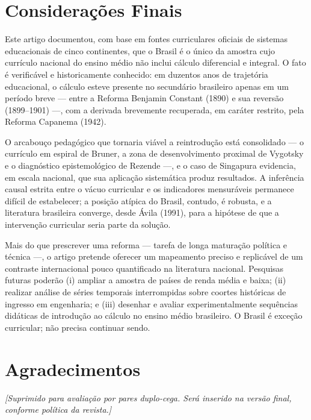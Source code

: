 \documentclass[12pt,a4paper,oneside]{article}
\begin{document}
\section{Considerações Finais}

Este artigo documentou, com base em fontes curriculares oficiais de
sistemas educacionais de cinco continentes, que o Brasil é o único da
amostra cujo currículo nacional do ensino médio não inclui cálculo
diferencial e integral. O fato é verificável e historicamente conhecido:
em duzentos anos de trajetória educacional, o cálculo esteve presente no
secundário brasileiro apenas em um período breve --- entre a Reforma
Benjamin Constant (1890) e sua reversão (1899--1901) ---, com a derivada
brevemente recuperada, em caráter restrito, pela Reforma Capanema (1942).

O arcabouço pedagógico que tornaria viável a reintrodução está
consolidado --- o currículo em espiral de Bruner, a zona de
desenvolvimento proximal de Vygotsky e o diagnóstico epistemológico de
Rezende ---, e o caso de Singapura evidencia, em escala nacional, que sua
aplicação sistemática produz resultados. A inferência causal estrita
entre o vácuo curricular e os indicadores mensuráveis permanece difícil
de estabelecer; a posição atípica do Brasil, contudo, é robusta, e a
literatura brasileira converge, desde Ávila (1991), para a hipótese de que
a intervenção curricular seria parte da solução.

Mais do que prescrever uma reforma --- tarefa de longa maturação política
e técnica ---, o artigo pretende oferecer um mapeamento preciso e
replicável de um contraste internacional pouco quantificado na literatura
nacional. Pesquisas futuras poderão (i) ampliar a amostra de países de
renda média e baixa; (ii) realizar análise de séries temporais
interrompidas sobre coortes históricas de ingresso em engenharia; e
(iii) desenhar e avaliar experimentalmente sequências didáticas de
introdução ao cálculo no ensino médio brasileiro. O Brasil é exceção
curricular; não precisa continuar sendo.

\section*{Agradecimentos}
\textit{[Suprimido para avaliação por pares duplo-cega. Será inserido na
versão final, conforme política da revista.]}
\end{document}
